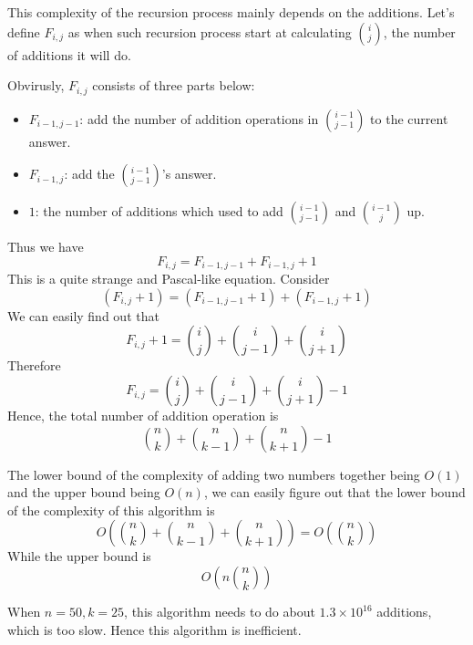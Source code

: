 This complexity of the recursion process mainly depends on the additions.
Let's define $F_{i, j}$ as when such recursion process start at calculating $\binom{i}{j}$, 
the number of additions it will do.

Obvirusly, $F_{i, j}$ consists of three parts below:
\begin{itemize}
\item $F_{i - 1, j - 1}$: add the number of addition operations in $\binom{i - 1}{j - 1}$ to the current answer.
\item $F_{i - 1, j}$: add the $\binom{i - 1}{j - 1}$'s answer.
\item $1$: the number of additions which used to add $\binom{i - 1}{j - 1}$ and $\binom{i - 1}{j}$ up.
\end{itemize}

Thus we have
\begin{equation}\label{equation3}
F_{i, j} = F_{i - 1, j - 1} + F_{i - 1, j} + 1
\end{equation}
This is a quite strange and Pascal-like equation.
Consider
\[(F_{i, j} + 1) = (F_{i - 1, j - 1} + 1) + (F_{i-1, j} + 1)\]
We can easily find out that
\[F_{i, j} + 1 = \binom{i}{j} + \binom{i}{j-1} + \binom{i}{j+1}\]
Therefore
\begin{equation}\label{equation4}
F_{i, j} = \binom{i}{j} + \binom{i}{j-1} + \binom{i}{j+1} - 1
\end{equation}
Hence, the total number of addition operation is
\[\binom{n}{k} + \binom{n}{k-1} + \binom{n}{k+1} - 1\]

The lower bound of the complexity of adding two numbers together being $O(1)$ and the upper bound being $O(n)$,
we can easily figure out that the lower bound of the complexity of this algorithm is
\[O\left(\binom{n}{k} + \binom{n}{k-1} + \binom{n}{k+1}\right) = O\left(\binom{n}{k}\right)\]
While the upper bound is 
\[O\left(n\binom{n}{k}\right)\]

When $n = 50, k = 25$, this algorithm needs to do about $1.3 \times 10^{16}$ additions, which is too slow. Hence this algorithm is inefficient. 

